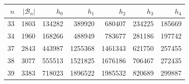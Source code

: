 \begin{tabular}{rrrrrrr}
\toprule
$n$ & $|\mathcal B_n|$ & $h_0$ & $h_1$ & $h_2$ & $h_3$ & $h_4$\\
\midrule
33 & 1803 & 134282 & 389920 & 680407 & 234225 & 185669\\
34 & 1960 & 168266 & 488949 & 783677 & 281186 & 197742\\
37 & 2843 & 443987 & 1255368 & 1461343 & 621750 & 257455\\
38 & 3077 & 555513 & 1521825 & 1676186 & 706467 & 272435\\
39 & 3383 & 718023 & 1896522 & 1985532 & 820689 & 299887\\
\bottomrule
\end{tabular}
